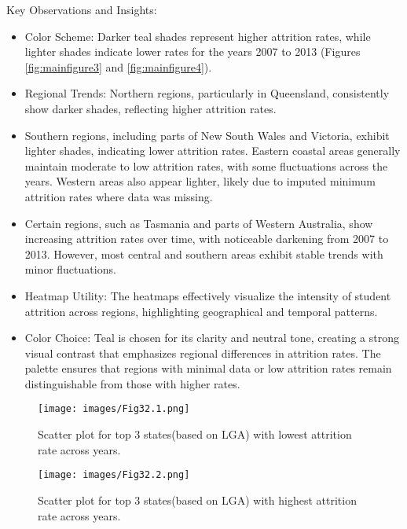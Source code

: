 \documentclass[conference]{IEEEtran}
\begin{document}
Key Observations and Insights: 
\begin{itemize} 
    \item Color Scheme: Darker teal shades represent higher attrition rates, while lighter shades indicate lower rates for the years 2007 to 2013 (Figures \ref{fig:mainfigure3} and \ref{fig:mainfigure4}).
    \item Regional Trends: Northern regions, particularly in Queensland, consistently show darker shades, reflecting higher attrition rates.
    \item Southern regions, including parts of New South Wales and Victoria, exhibit lighter shades, indicating lower attrition rates. Eastern coastal areas generally maintain moderate to low attrition rates, with some fluctuations across the years. Western areas also appear lighter, likely due to imputed minimum attrition rates where data was missing.
    \item Certain regions, such as Tasmania and parts of Western Australia, show increasing attrition rates over time, with noticeable darkening from 2007 to 2013. However, most central and southern areas exhibit stable trends with minor fluctuations.
    \item Heatmap Utility: The heatmaps effectively visualize the intensity of student attrition across regions, highlighting geographical and temporal patterns.
    \item Color Choice: Teal is chosen for its clarity and neutral tone, creating a strong visual contrast that emphasizes regional differences in attrition rates. The palette ensures that regions with minimal data or low attrition rates remain distinguishable from those with higher rates.
\end{itemize}
\begin{figure}[H]
    \centering
    \texttt{[image: images/Fig32.1.png]}
    \caption{Scatter plot for top 3 states(based on LGA) with lowest attrition rate across years.}
    \label{fig:bubble3}
\end{figure}
\begin{figure}[H]
    \centering
    \texttt{[image: images/Fig32.2.png]}
    \caption{Scatter plot for top 3 states(based on LGA) with highest attrition rate across years.}
    \label{fig:bubble4}
\end{figure}
\end{document}
